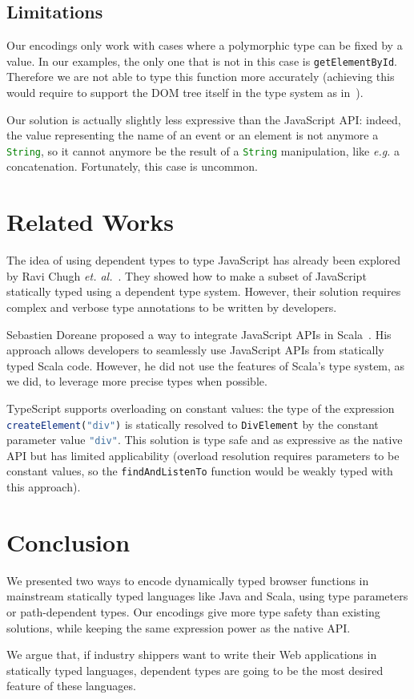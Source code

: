 \documentclass{llncs}
\newcommand{\jscode}[1]{\lstinline[language=JavaScript]|#1|}
\begin{document}
\subsection{Limitations}

Our encodings only work with cases where a polymorphic type can be fixed by a value. In our examples, the only one that is not in this case is \jscode{getElementById}. Therefore we are not able to type this function more accurately (achieving this would require to support the DOM tree itself in the type system as in~\cite{Lerner13_TypedJQuery}).

Our solution is actually slightly less expressive than the JavaScript API: indeed, the value representing the name of an event or an element is not anymore a \jscode{String}, so it cannot anymore be the result of a \jscode{String} manipulation, like \emph{e.g.} a concatenation. Fortunately, this case is uncommon.

\section{Related Works}
\label{sec-related}

The idea of using dependent types to type JavaScript has already been explored by Ravi Chugh \emph{et. al.}~\cite{Chugh12_DJS}. They showed how to make a subset of JavaScript statically typed using a dependent type system. However, their solution requires complex and verbose type annotations to be written by developers.

Sebastien Doreane proposed a way to integrate JavaScript APIs in Scala~\cite{Doeraene13_ScalaJs}. His approach allows developers to seamlessly use JavaScript APIs from statically typed Scala code. However, he did not use the features of Scala's type system, as we did, to leverage more precise types when possible.

TypeScript supports overloading on constant values: the type of the expression \jscode{createElement("div")} is statically resolved to \jscode{DivElement} by the constant parameter value \jscode{"div"}. This solution is type safe and as expressive as the native API but has limited applicability (overload resolution requires parameters to be constant values, so the \jscode{findAndListenTo} function would be weakly typed with this approach).

\section{Conclusion}
\label{sec-conclusion}

We presented two ways to encode dynamically typed browser functions in mainstream statically typed languages like Java and Scala, using type parameters or path-dependent types. Our encodings give more type safety than existing solutions, while keeping the same expression power as the native API.

We argue that, if industry shippers want to write their Web applications in statically typed languages, dependent types are going to be the most desired feature of these languages.



\end{document}
